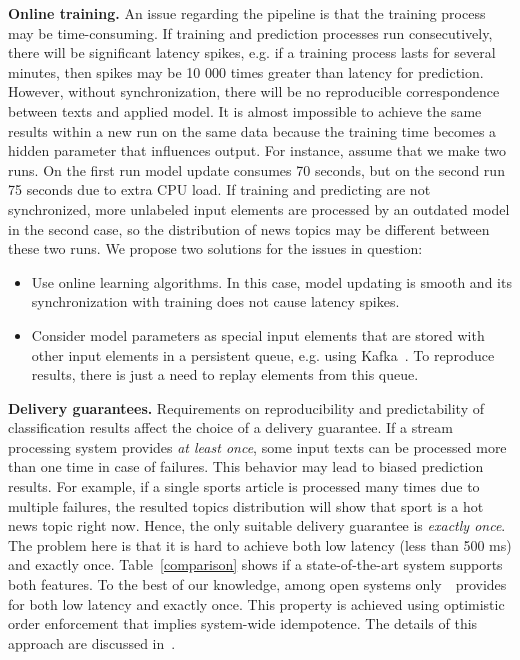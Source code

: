 \label {fs-challenges}

\indent

{\bf Online training.} An issue regarding the pipeline is that the training process may be time-consuming. If training and prediction processes run consecutively, there will be significant latency spikes, e.g. if a training process lasts for several minutes, then spikes may be 10 000 times greater than latency for prediction. However, without synchronization, there will be no reproducible correspondence between texts and applied model. It is almost impossible to achieve the same results within a new run on the same data because the training time becomes a hidden parameter that influences output. For instance, assume that we make two runs. On the first run model update consumes 70 seconds, but on the second run 75 seconds due to extra CPU load. If training and predicting are not synchronized, more unlabeled input elements are processed by an outdated model in the second case, so the distribution of news topics may be different between these two runs. We propose two solutions for the issues in question:

\begin{itemize}
    \item Use online learning algorithms. In this case, model updating is smooth and its synchronization with training does not cause latency spikes.
    \item Consider model parameters as special input elements that are stored with other input elements in a persistent queue, e.g. using Kafka~\cite{kreps2011kafka}. To reproduce results, there is just a need to replay elements from this queue.
\end{itemize}

{\bf Delivery guarantees.} Requirements on reproducibility and predictability of classification results affect the choice of a delivery guarantee. If a stream processing system provides {\em at least once}, some input texts can be processed more than one time in case of failures. This behavior may lead to biased prediction results. For example, if a single sports article is processed many times due to multiple failures, the resulted topics distribution will show that sport is a hot news topic right now. Hence, the only suitable delivery guarantee is {\em exactly once}. The problem here is that it is hard to achieve both low latency (less than 500 ms) and exactly once. Table~\ref{comparison} shows if a state-of-the-art system supports both features. To the best of our knowledge, among open systems only~\FlameStream\ provides for both low latency and exactly once. This property is achieved using optimistic order enforcement that implies system-wide idempotence. The details of this approach are discussed in~\cite{we2018adbis, we2018beyondmr}.

